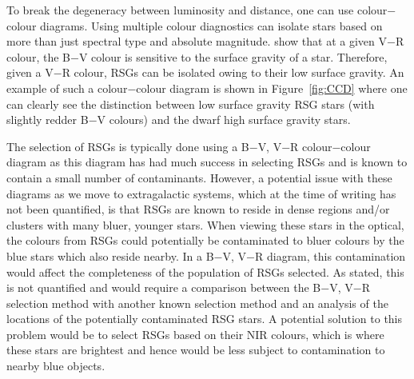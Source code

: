 
To break the degeneracy between luminosity and distance, one can use colour$-$colour diagrams.
Using multiple colour diagnostics can isolate stars based on more than just spectral type and absolute magnitude.
\cite{1998ApJ...501..153M} show that at a given V$-$R colour, the B$-$V colour is sensitive to the surface gravity of a star.
Therefore, given a V$-$R colour, RSGs can be isolated owing to their low surface gravity.
An example of such a colour$-$colour diagram is shown in Figure~\ref{fig:CCD} where one can clearly see the distinction between low surface gravity RSG stars (with slightly redder B$-$V colours) and the dwarf high surface gravity stars.

The selection of RSGs is typically done using a B$-$V, V$-$R colour$-$colour diagram as this diagram has had much success in selecting RSGs and is known to contain a small number of contaminants.
However, a potential issue with these diagrams as we move to extragalactic systems, which at the time of writing has not been quantified, is that RSGs are known to reside in dense regions and/or clusters with many bluer, younger stars.
When viewing these stars in the optical, the colours from RSGs could potentially be contaminated to bluer colours by the blue stars which also reside nearby.
In a B$-$V, V$-$R diagram, this contamination would affect the completeness of the population of RSGs selected.
As stated, this is not quantified and would require a comparison between the B$-$V, V$-$R selection method with another known selection method and an analysis of the locations of the potentially contaminated RSG stars.
A potential solution to this problem would be to select RSGs based on their NIR colours, which is where these stars are brightest and hence would be less subject to contamination to nearby blue objects.


